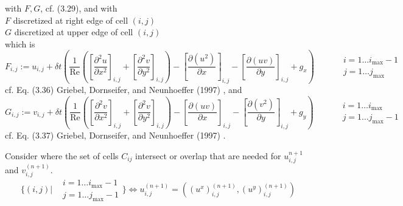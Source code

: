 \documentclass[10pt]{amsart}
\begin{document}
\begin{multicols*}{2}
with $F,G$, cf. (3.29), and with \\

$F$ discretized at right edge of cell $(i,j)$ \\ 
$G$ discretized at upper edge of cell $(i,j)$ \\

which is 
\begin{equation}
  F_{i,j} := u_{i,j} + \delta t\left( \frac{1}{ \text{Re}} \left( \left[ \frac{ \partial^2 u}{ \partial x^2} \right]_{i,j} + \left[ \frac{ \partial^2 v}{ \partial y^2 }\right]_{i,j} \right) - \left[ \frac{ \partial (u^2) }{ \partial x} \right]_{i,j} - \left[ \frac{ \partial (uv) }{ \partial y} \right]_{i,j} + g_x \right) \qquad \, \begin{aligned} & i = 1 \dots i_{\text{max}}-1  \\
    & j = 1\dots j_{\text{max}}  \end{aligned}
\end{equation}
cf. Eq. (3.36) Griebel, Dornseifer, and Neunhoeffer (1997) \cite{GDN1997}, and 
\begin{equation}
  G_{i,j} := v_{i,j} + \delta t\left( \frac{1}{ \text{Re}} \left( \left[ \frac{ \partial^2 v}{ \partial x^2} \right]_{i,j} + \left[ \frac{ \partial^2 v}{ \partial y^2 }\right]_{i,j} \right) - \left[ \frac{ \partial (uv) }{ \partial x} \right]_{i,j} - \left[ \frac{ \partial (v^2) }{ \partial y} \right]_{i,j} + g_y \right) \qquad \, \begin{aligned} & i = 1 \dots i_{\text{max}}  \\
    & j = 1\dots j_{\text{max}} - 1 \end{aligned}
\end{equation}
cf. Eq. (3.37) Griebel, Dornseifer, and Neunhoeffer (1997) \cite{GDN1997}.  

Consider where the set of cells $C_{ij}$ intersect or overlap that are needed for $u_{i,j}^{n+1}$ and $v_{i,j}^{(n+1)}$.
\[
\lbrace (i,j) | \begin{aligned} & i = 1\dots i_{\text{max}}-1  \\
  & j = 1 \dots j_{\text{max}} - 1 \end{aligned} \rbrace \Longleftrightarrow u^{(n+1)}_{i,j} = ((u^x)^{(n+1)}_{i,j}, (u^y)^{(n+1)}_{i,j} )
\]



\end{multicols*}
\end{document}

